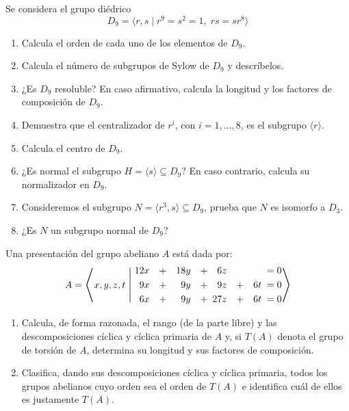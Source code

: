 \documentclass[12pt]{article}
\begin{document}
    \begin{ejercicio}[3 puntos]
        Se considera el grupo diédrico $$D_9 = \langle r, s \mid r^9 = s^2 = 1,\; rs = sr^{8} \rangle$$
        \begin{enumerate}[label=(\alph*)]
            \item Calcula el orden de cada uno de los elementos de $D_9$.
            \item Calcula el número de subgrupos de Sylow de $D_9$ y descríbelos.
            \item ¿Es $D_9$ resoluble? En caso afirmativo, calcula la longitud y los factores de composición de $D_9$.
            \item Demuestra que el centralizador de $r^i$, con $i = 1,\dots,8$, es el subgrupo $\langle r \rangle$.
            \item Calcula el centro de $D_9$.
            \item ¿Es normal el subgrupo $H = \langle s \rangle \subseteq D_9$? En caso contrario, calcula su normalizador en $D_9$.
            \item Consideremos el subgrupo $N = \langle r^3, s \rangle \subseteq D_9$, prueba que $N$ es isomorfo a $D_3$.
            \item ¿Es $N$ un subgrupo normal de $D_9$?
        \end{enumerate}
    \end{ejercicio}

    \begin{ejercicio}[2 puntos]
        Una presentación del grupo abeliano $A$ está dada por:
        $$
            A = \scalebox{1.2}{$\Biggl\langle$}x,y,z,t \;\scalebox{1.2}{$\Biggm|$}\;
            \begin{alignedat}{7}
            12&x& \quad &+& \quad 18&y& \quad &+& \quad  6&z& \phantom{6t} &\;=\; &0\\
            9&x& &+&  9&y& &+&  9&z& \quad + \quad 6t &\;=\; &0\\
            6&x& &+&  9&y& &+& 27&z& \quad + \quad 6t &\;=\; &0
            \end{alignedat}
            \scalebox{1.2}{$\Biggr\rangle$}
        $$
        \begin{enumerate}[label=(\alph*)]
            \item Calcula, de forma razonada, el rango (de la parte libre) y las descomposiciones cíclica y cíclica primaria de $A$ y, si $T(A)$ denota el grupo de torsión de $A$, determina su longitud y sus factores de composición.
            \item Clasifica, dando sus descomposiciones cíclica y cíclica primaria, todos los grupos abelianos cuyo orden sea el orden de $T(A)$ e identifica cuál de ellos es justamente $T(A)$.
        \end{enumerate}

    \end{ejercicio}
\end{document}
